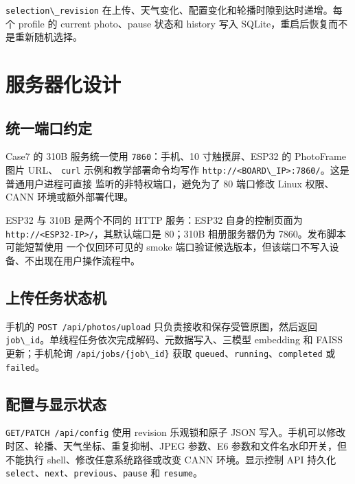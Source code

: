 \passthrough{\lstinline!selection\_revision!}
在上传、天气变化、配置变化和轮播时隙到达时递增。每个 profile 的 current
photo、pause 状态和 history 写入 SQLite，重启后恢复而不是重新随机选择。

\section{服务器化设计}\label{ux670dux52a1ux5668ux5316ux8bbeux8ba1}

\subsection{统一端口约定}\label{ux7edfux4e00ux7aefux53e3ux7ea6ux5b9a}

Case7 的 310B 服务统一使用 \passthrough{\lstinline!7860!}：手机、10
寸触摸屏、ESP32 的 PhotoFrame 图片 URL、 \passthrough{\lstinline!curl!}
示例和教学部署命令均写作
\passthrough{\lstinline!http://<BOARD\_IP>:7860/!}。这是普通用户进程可直接
监听的非特权端口，避免为了 80 端口修改 Linux 权限、CANN
环境或额外部署代理。

ESP32 与 310B 是两个不同的 HTTP 服务：ESP32 自身的控制页面为
\passthrough{\lstinline!http://<ESP32-IP>/!}，其默认端口是 80；310B
相册服务器仍为 7860。发布脚本可能短暂使用 一个仅回环可见的 smoke
端口验证候选版本，但该端口不写入设备、不出现在用户操作流程中。

\subsection{上传任务状态机}\label{ux4e0aux4f20ux4efbux52a1ux72b6ux6001ux673a}

手机的 \passthrough{\lstinline!POST /api/photos/upload!}
只负责接收和保存受管原图，然后返回
\passthrough{\lstinline!job\_id!}。单线程任务依次完成解码、元数据写入、三模型
embedding 和 FAISS 更新；手机轮询
\passthrough{\lstinline!/api/jobs/\{job\_id\}!} 获取
\passthrough{\lstinline!queued!}、\passthrough{\lstinline!running!}、\passthrough{\lstinline!completed!}
或 \passthrough{\lstinline!failed!}。

\subsection{配置与显示状态}\label{ux914dux7f6eux4e0eux663eux793aux72b6ux6001}

\passthrough{\lstinline!GET/PATCH /api/config!} 使用 revision
乐观锁和原子 JSON 写入。手机可以修改时区、轮播、天气坐标、重复抑制、JPEG
参数、E6 参数和文件名水印开关，但不能执行 shell、修改任意系统路径或改变
CANN 环境。显示控制 API 持久化
\passthrough{\lstinline!select!}、\passthrough{\lstinline!next!}、\passthrough{\lstinline!previous!}、\passthrough{\lstinline!pause!}
和 \passthrough{\lstinline!resume!}。

